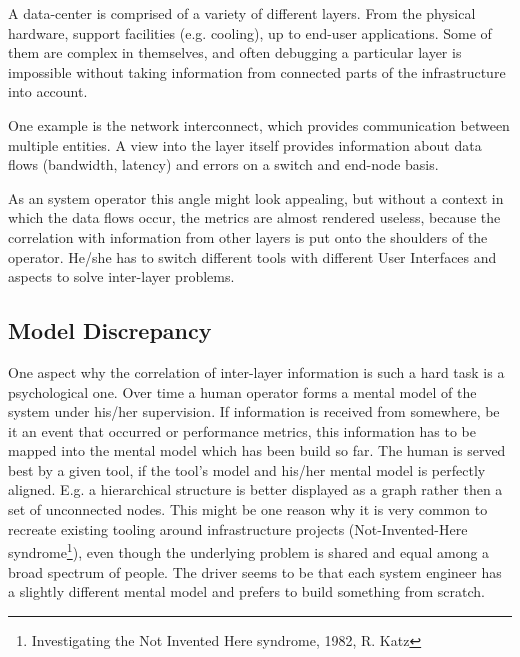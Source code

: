 A data-center is comprised of a variety of different layers. From the physical hardware, support facilities (e.g. cooling), up to end-user applications.
Some of them are complex in themselves, and often debugging a particular layer is impossible without taking information from connected parts
of the infrastructure into account.

One example is the network interconnect, which provides communication between multiple entities.
A view into the layer itself provides information about data flows (bandwidth, latency) and errors on a switch and end-node basis.

As an system operator this angle might look appealing, but without a context in which the data flows occur, the metrics are almost rendered useless,
because the correlation with information from other layers is put onto the shoulders of the operator.
He/she has to switch different tools with different User Interfaces and aspects to solve inter-layer problems.
\subsection{Model Discrepancy}
One aspect why the correlation of inter-layer information is such a hard task is a psychological one. Over time a human operator forms a mental model
of the system under his/her supervision. If information is received from somewhere, be it an event that occurred or performance metrics, this information
has to be mapped into the mental model which has been build so far.
The human is served best by a given tool, if the tool's model and his/her mental model is perfectly aligned.
E.g. a hierarchical structure is better displayed as a graph rather then a set of unconnected nodes.
This might be one reason why it is very common to recreate existing tooling around infrastructure projects
(Not-Invented-Here syndrome\footnote{Investigating the Not Invented Here syndrome, 1982, R. Katz}), even though the underlying problem
is shared and equal among a broad spectrum of people. The driver seems to be that each system engineer has a slightly different mental
model and prefers to build something from scratch.


